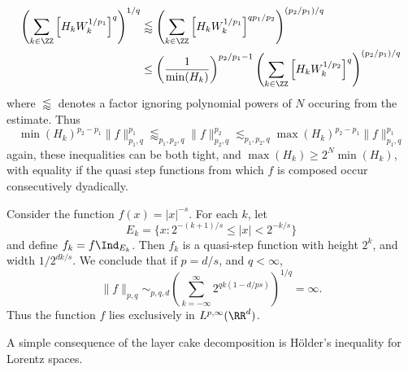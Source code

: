 \begin{remark}
\begin{align*}
    \end{align*}
    \begin{align*}
        \left( \sum_{k \in \ZZ} \left[ H_k W_k^{1/p_1} \right]^q \right)^{1/q} &\lessapprox \left( \sum_{k \in \ZZ} \left[ H_k W_k^{1/p_1} \right]^{qp_1/p_2} \right)^{(p_2/p_1)/q}\\
        &\leq \left( \frac{1}{\min(H_k)} \right)^{p_2/p_1 - 1} \left( \sum_{k \in \ZZ} \left[ H_k W_k^{1/p_2} \right]^q \right)^{(p_2/p_1)/q}
    \end{align*}
    where $\lessapprox$ denotes a factor ignoring polynomial powers of $N$ occuring from the estimate. Thus
    \[ \min(H_k)^{p_2 - p_1} \| f \|_{p_1,q}^{p_1} \lessapprox_{p_1,p_2,q} \| f \|_{p_2,q}^{p_2} \lesssim_{p_1,p_2,q} \max(H_k)^{p_2-p_1} \| f \|_{p_1,q}^{p_1} \]
    again, these inequalities can be both tight, and $\max(H_k) \geq 2^N \min(H_k)$, with equality if the quasi step functions from which $f$ is composed occur consecutively dyadically.
\end{remark}

\begin{example}
    Consider the function $f(x) = |x|^{-s}$. For each $k$, let
    \[ E_k = \{ x : 2^{-(k+1)/s} \leq |x| < 2^{-k/s} \} \]
    and define $f_k = f \Ind_{E_k}$. Then $f_k$ is a quasi-step function with height $2^k$, and width $1/2^{dk/s}$. We conclude that if $p = d/s$, and $q < \infty$,
    \[ \| f \|_{p,q} \sim_{p,q,d} \left( \sum_{k = -\infty}^\infty 2^{qk(1 - d/ps)} \right)^{1/q} = \infty. \]
    Thus the function $f$ lies exclusively in $L^{p,\infty}(\RR^d)$.
\end{example}

A simple consequence of the layer cake decomposition is H\"{o}lder's inequality for Lorentz spaces.

